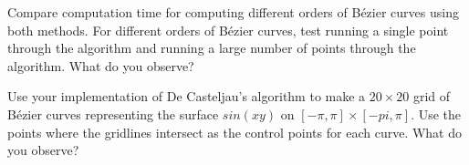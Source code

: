 \begin{problem}
Compare computation time for computing different orders of B\'{e}zier curves using both methods. 
For different orders of B\'{e}zier curves, test running a single point through the algorithm and running a large number of points through the algorithm. 
What do you observe?
\end{problem}

\begin{problem}
Use your implementation of De Casteljau's algorithm to make a $20\times 20$ grid of B\'{e}zier curves representing the surface $sin(xy)$ on $[-\pi,\pi]\times [-pi,\pi]$.
Use the points where the gridlines intersect as the control points for each curve. 
What do you observe?
\end{problem}
